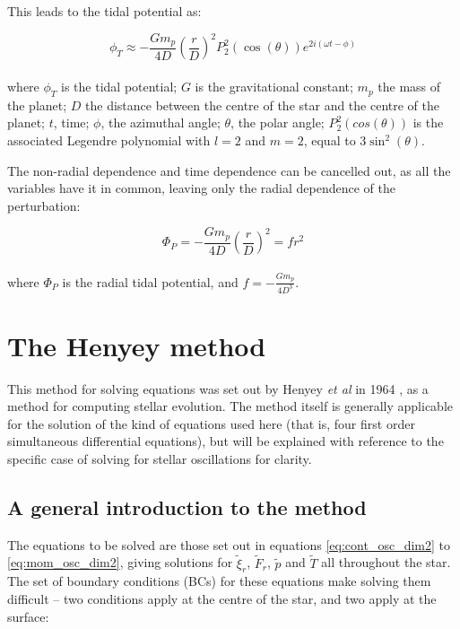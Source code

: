 \documentclass[11pt]{amsart}
\begin{document}
This leads to the tidal potential as:

\begin{equation} \label{eq:tidal_full}
\phi_{T} \approx - \frac{G m_{p}}{4 D}  \left( \frac{r}{D} \right)^{2}  P_{2}^{2} (\cos (\theta)) e^{2 i (\omega t - \phi)} 
\end{equation}
\\
where $\phi_{T}$ is the tidal potential; $G$ is the gravitational constant; $m_{p}$ the mass of the planet; $D$ the distance between the centre of the star and the centre of the planet; $t$, time; $\phi$, the azimuthal angle; $\theta$, the polar angle; $P_{2}^{2}(cos(\theta))$ is the associated Legendre polynomial with $l=2$ and $m=2$, equal to $3 \sin^{2}(\theta)$.

The non-radial dependence and time dependence can be cancelled out, as all the variables have it in common, leaving only the radial dependence of the perturbation:

\begin{equation}
\Phi_{P} = - \frac{G m_{p}}{4 D}  \left( \frac{r}{D} \right)^{2}  = f r^{2}
\end{equation}
\\
where $\Phi_{P}$ is the radial tidal potential, and $f = - \frac{G m_{p}}{4 D^{3}}$.














\section{The Henyey method}   \label{Henyey}

This method for solving equations was set out by Henyey \textit{et al} in 1964 \cite{Henyey1964}, as a method for computing stellar evolution. The method itself is generally applicable for the solution of the kind of equations used here (that is, four first order simultaneous differential equations), but will be explained with reference to the specific case of solving for stellar oscillations for clarity.


\subsection{A general introduction to the method}  \label{Henyey:General}

The equations to be solved are those set out in equations \ref{eq:cont_osc_dim2} to \ref{eq:mom_osc_dim2}, giving solutions for $\tilde{\xi}_{r}$, $\tilde{F}_{r}$, $\tilde{p}$ and $\tilde{T}$ all throughout the star.  The set of boundary conditions (BCs) for these equations make solving them difficult -- two conditions apply at the centre of the star, and two apply at the surface:
\end{document}
